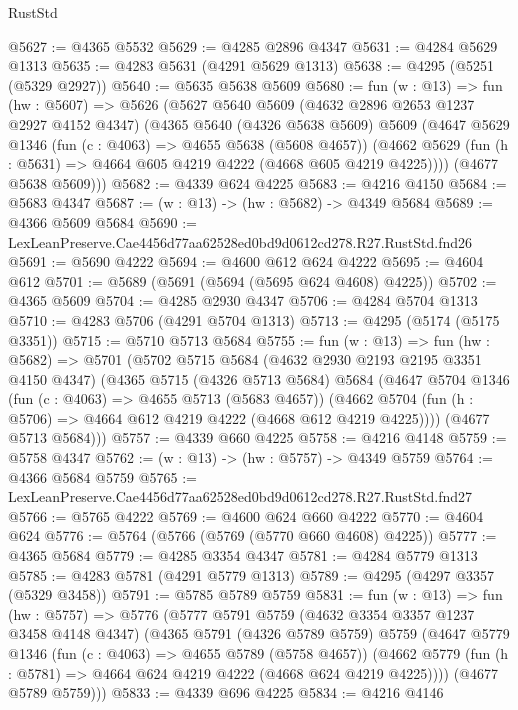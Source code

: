 \begin{lexlean}{RustStd}
\begin{coremodule}
@5627 := @4365 @5532
@5629 := @4285 @2896 @4347
@5631 := @4284 @5629 @1313
@5635 := @4283 @5631 (@4291 @5629 @1313)
@5638 := @4295 (@5251 (@5329 @2927))
@5640 := @5635 @5638 @5609
@5680 := fun (w : @13) =>
  fun (hw : @5607) =>
  @5626
    (@5627
      @5640
      @5609
      (@4632 @2896 @2653 @1237 @2927 @4152 @4347)
      (@4365
        @5640
        (@4326 @5638 @5609)
        @5609
        (@4647
          @5629
          @1346
          (fun (c : @4063) => @4655 @5638 (@5608 @4657))
          (@4662 @5629 (fun (h : @5631) => @4664 @605 @4219 @4222 (@4668 @605 @4219 @4225))))
        (@4677 @5638 @5609)))
@5682 := @4339 @624 @4225
@5683 := @4216 @4150
@5684 := @5683 @4347
@5687 := (w : @13) -> (hw : @5682) -> @4349 @5684
@5689 := @4366 @5609 @5684
@5690 := LexLeanPreserve.Cae4456d77aa62528ed0bd9d0612cd278.R27.RustStd.fnd26
@5691 := @5690 @4222
@5694 := @4600 @612 @624 @4222
@5695 := @4604 @612
@5701 := @5689 (@5691 (@5694 (@5695 @624 @4608) @4225))
@5702 := @4365 @5609
@5704 := @4285 @2930 @4347
@5706 := @4284 @5704 @1313
@5710 := @4283 @5706 (@4291 @5704 @1313)
@5713 := @4295 (@5174 (@5175 @3351))
@5715 := @5710 @5713 @5684
@5755 := fun (w : @13) =>
  fun (hw : @5682) =>
  @5701
    (@5702
      @5715
      @5684
      (@4632 @2930 @2193 @2195 @3351 @4150 @4347)
      (@4365
        @5715
        (@4326 @5713 @5684)
        @5684
        (@4647
          @5704
          @1346
          (fun (c : @4063) => @4655 @5713 (@5683 @4657))
          (@4662 @5704 (fun (h : @5706) => @4664 @612 @4219 @4222 (@4668 @612 @4219 @4225))))
        (@4677 @5713 @5684)))
@5757 := @4339 @660 @4225
@5758 := @4216 @4148
@5759 := @5758 @4347
@5762 := (w : @13) -> (hw : @5757) -> @4349 @5759
@5764 := @4366 @5684 @5759
@5765 := LexLeanPreserve.Cae4456d77aa62528ed0bd9d0612cd278.R27.RustStd.fnd27
@5766 := @5765 @4222
@5769 := @4600 @624 @660 @4222
@5770 := @4604 @624
@5776 := @5764 (@5766 (@5769 (@5770 @660 @4608) @4225))
@5777 := @4365 @5684
@5779 := @4285 @3354 @4347
@5781 := @4284 @5779 @1313
@5785 := @4283 @5781 (@4291 @5779 @1313)
@5789 := @4295 (@4297 @3357 (@5329 @3458))
@5791 := @5785 @5789 @5759
@5831 := fun (w : @13) =>
  fun (hw : @5757) =>
  @5776
    (@5777
      @5791
      @5759
      (@4632 @3354 @3357 @1237 @3458 @4148 @4347)
      (@4365
        @5791
        (@4326 @5789 @5759)
        @5759
        (@4647
          @5779
          @1346
          (fun (c : @4063) => @4655 @5789 (@5758 @4657))
          (@4662 @5779 (fun (h : @5781) => @4664 @624 @4219 @4222 (@4668 @624 @4219 @4225))))
        (@4677 @5789 @5759)))
@5833 := @4339 @696 @4225
@5834 := @4216 @4146

\end{coremodule}
\end{lexlean}
